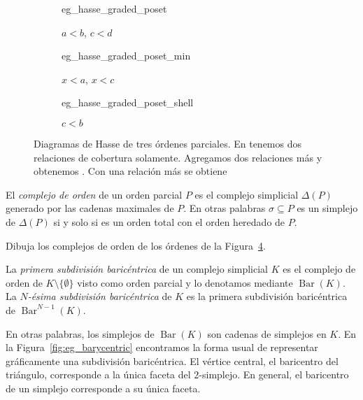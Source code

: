 \documentclass{standalone}
\begin{document}
	\begin{figure}[h]
		\centering
		\begin{subfigure}{.3\textwidth}
			\centering
			{eg_hasse_graded_poset}
			\caption{$a<b$, $c<d$}
			\label{fig:hasse_graded_poset}
		\end{subfigure}
		\begin{subfigure}{.3\textwidth}
			\centering
			{eg_hasse_graded_poset_min}
			\caption{$x<a$, $x<c$}
			\label{fig:hasse_graded_poset_min}
		\end{subfigure}
		\begin{subfigure}{.3\textwidth}
			\centering
			{eg_hasse_graded_poset_shell}
			\caption{$c<b$}
			\label{fig:hasse_graded_poset_shell}
		\end{subfigure}
		\caption{Diagramas de Hasse de tres órdenes parciales. En  tenemos dos relaciones de cobertura solamente. Agregamos dos relaciones más y obtenemos . Con una relación más se obtiene }
		\label{fig:hasse}
	\end{figure}
	
	
	\begin{definition}
		El \emph{complejo de orden} de un orden parcial $P$ es el complejo simplicial $\Delta(P)$ generado por las cadenas maximales de $P$. En otras palabras $\sigma\subseteq P$ es un simplejo de $\Delta(P)$ si y solo si es un orden total con el orden heredado de $P$.
	\end{definition}
	
	\begin{exercise}
		Dibuja los complejos de orden de los órdenes de la Figura~\ref{fig:hasse}.
	\end{exercise}
	
	\begin{definition}\label{def:barycentric_subdivision}
		La \emph{primera subdivisión baricéntrica} de un complejo simplicial $K$ es el complejo de orden de $K\setminus\{\emptyset\}$ visto como orden parcial y lo denotamos mediante $\operatorname{Bar}(K)$. La \emph{$N$-ésima subdivisión baricéntrica} de $K$ es la primera subdivisión baricéntrica de $\operatorname{Bar}^{N-1}(K)$.
	\end{definition} 
	
	En otras palabras, los simplejos de $\operatorname{Bar}(K)$ son cadenas de simplejos en $K$. En la Figura~\ref{fig:eg_barycentric} encontramos la forma usual de representar gráficamente una subdivisión baricéntrica. El vértice central, el baricentro del triángulo, corresponde a la única faceta del $2$-simplejo. En general, el baricentro de un simplejo corresponde a su única faceta. 
	
\end{document}

